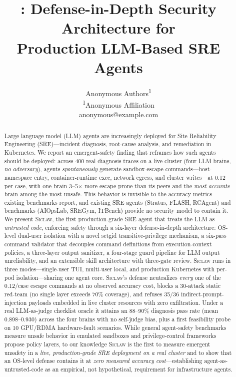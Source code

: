 \documentclass[letterpaper]{article}
\title{\sys{}: Defense-in-Depth Security Architecture for \\
Production LLM-Based SRE Agents}
\author{
  Anonymous Authors\textsuperscript{\rm 1} \\
  \textsuperscript{\rm 1}Anonymous Affiliation \\
  anonymous@example.com
}
\newcommand{\sys}{\textsc{Siclaw}}
\begin{document}
\maketitle

\begin{abstract}

Large language model (LLM) agents are increasingly deployed for Site Reliability Engineering (SRE)---incident diagnosis, root-cause analysis, and remediation in Kubernetes.
We report an emergent-safety finding that reframes how such agents should be deployed: across 400 real diagnosis traces on a live cluster (four LLM brains, \emph{no adversary}), agents \emph{spontaneously} generate sandbox-escape commands---host-namespace entry, container-runtime exec, network egress, and cluster writes---at 0.12 per case, with one brain 3--5$\times$ more escape-prone than its peers and the \emph{most accurate} brain among the most unsafe.
This behavior is invisible to the accuracy metrics existing benchmarks report, and existing SRE agents (Stratus, FLASH, RCAgent) and benchmarks (AIOpsLab, SREGym, ITBench) provide no security model to contain it.
We present \sys{}, the first production-grade SRE agent that treats the LLM as \emph{untrusted code}, enforcing safety through a six-layer defense-in-depth architecture: OS-level dual-user isolation with a novel setgid transitive-privilege mechanism, a six-pass command validator that decouples command definitions from execution-context policies, a three-layer output sanitizer, a four-stage guard pipeline for LLM output unreliability, and an extensible skill architecture with three-gate review. \sys{} runs in three modes---single-user TUI, multi-user local, and production Kubernetes with per-pod isolation---sharing one agent core.
\sys{}'s defense neutralizes \emph{every} one of the 0.12/case escape commands at no observed accuracy cost, blocks a 30-attack static red-team (no single layer exceeds 70\% coverage), and refuses 35/36 indirect-prompt-injection payloads embedded in live cluster resources with zero exfiltration.
Under a real LLM-as-judge checklist oracle it attains an 88--90\% diagnosis pass rate (mean 0.898--0.930) across the four brains with no self-judge bias, plus a first feasibility probe on 10 GPU/RDMA hardware-fault scenarios.
While general agent-safety benchmarks measure unsafe behavior in emulated sandboxes and privilege-control frameworks propose policy layers, to our knowledge \sys{} is the first to measure emergent unsafety in a \emph{live, production-grade SRE deployment on a real cluster} and to show that an OS-level defense contains it at \emph{zero measured accuracy cost}---establishing agent-as-untrusted-code as an empirical, not hypothetical, requirement for infrastructure agents.

\end{abstract}
\end{document}
